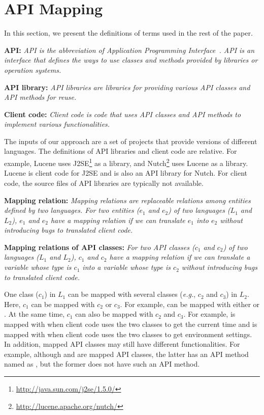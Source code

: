 \section{API Mapping}
\label{sec:mapping}

In this section, we present the definitions of terms used in the
rest of the paper.

\textbf{API:} \emph{API is the abbreviation of Application
Programming Interface~\cite{orenstein2000quickstudy}. API is an
interface that defines the ways to use classes and methods provided
by libraries or operation systems.}

\textbf{API library:} \emph{API libraries are libraries for
providing various API classes and API methods for reuse.}

\textbf{Client code:} \emph{Client code is code that uses API
classes and API methods to implement various functionalities.}

The inputs of our approach are a set of projects that provide
versions of different languages. The definitions of API libraries
and client code are relative. For example, Lucene uses
J2SE\footnote{\url{http://java.sun.com/j2se/1.5.0/}} as a library,
and Nutch\footnote{\url{http://lucene.apache.org/nutch/}} uses
Lucene as a library. Lucene is client code for J2SE and is also an
API library for Nutch. For client code, the source files of API
libraries are typically not available.

\textbf{Mapping relation:} \emph{Mapping relations are replaceable
relations among entities defined by two languages. For two entities
($e_1$ and $e_2$) of two languages ($L_1$ and $L_2$), $e_1$ and
$e_2$ have a mapping relation if we can translate $e_1$ into $e_2$
without introducing bugs to translated client code.}

\textbf{Mapping relations of API classes:} \emph{For two API classes
($c_1$ and $c_2$) of two languages ($L_1$ and $L_2$), $c_1$ and
$c_2$ have a mapping relation if we can translate a variable whose
type is $c_1$ into a variable whose type is $c_2$ without
introducing bugs to translated client code.}

One class ($c_1$) in $L_1$ can be mapped with several classes
(\emph{e.g.}, $c_2$ and $c_3$) in $L_2$. Here, $c_1$ can be mapped
with $c_2$ or $c_3$. For example,  can
be mapped with either  or
. At the same time, $c_1$
can also be mapped with $c_2$ and $c_3$. For example,
 is mapped with 
when client code uses the two classes to get the current time and is
mapped with  when client code uses the
two classes to get environment settings. In addition, mapped API
classes may still have different functionalities. For example,
although  and  are
mapped API classes, the latter has an API method named as
, but the former does not have such an API method.

